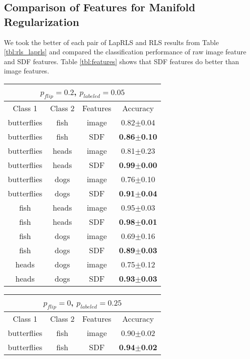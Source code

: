 \documentclass[anon,11pt]{9520} %
\begin{document}
\subsection{Comparison of Features for Manifold Regularization}
We took the better of each pair of LapRLS and RLS results from Table
\ref{tbl:rls_laprls} and compared the classification performance of raw image
feature and SDF features. Table \ref{tbl:features} shows that SDF features do
better than image features.
\begin{table}[h!]
\tiny
\begin{center}
\begin{tabular}{|c|c|c|c|}
\multicolumn{4}{c}{$p_{flip} = 0.2$, $p_{labeled} = 0.05$}\\
\hline
Class 1 & Class 2 & Features & Accuracy\\\hline

butterflies&	fish&	image&	0.82$\pm$0.04\\
butterflies&	fish&	SDF&	\textbf{0.86$\pm$0.10}\\\hline

butterflies&	heads&	image&	0.81$\pm$0.23\\
butterflies&	heads&	SDF&	\textbf{0.99$\pm$0.00}\\\hline

butterflies&	dogs&	image&	0.76$\pm$0.10\\
butterflies&	dogs&	SDF&	\textbf{0.91$\pm$0.04}\\\hline

fish&	heads&	image&	0.95$\pm$0.03\\
fish&	heads&	SDF&	\textbf{0.98$\pm$0.01}\\\hline

fish&	dogs&	image&	0.69$\pm$0.16\\
fish&	dogs&	SDF&	\textbf{0.89$\pm$0.03}\\\hline

heads&	dogs&	image&	0.75$\pm$0.12\\
heads&	dogs&	SDF&	\textbf{0.93$\pm$0.03}\\\hline
\end{tabular}
\begin{tabular}{|c|c|c|c|}
\multicolumn{4}{c}{$p_{flip} = 0$, $p_{labeled} = 0.25$}\\
\hline
Class 1 & Class 2 & Features & Accuracy\\\hline

butterflies&	fish&	image&		0.90$\pm$0.02\\
butterflies&	fish&	SDF&					\textbf{0.94$\pm$0.02}\\\hline


\end{tabular}
\end{center}
\end{table}
\end{document}
